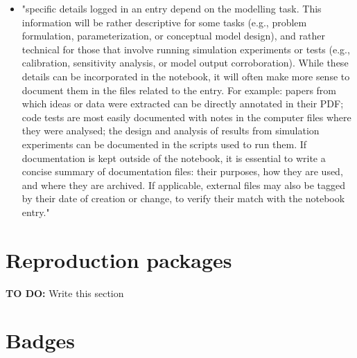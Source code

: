 \begin{itemize}
    \item "specific details logged in an entry depend on the modelling task. This information will be rather descriptive for some tasks (e.g., problem formulation, parameterization, or conceptual model design), and rather technical for those that involve running simulation experiments or tests (e.g., calibration, sensitivity analysis, or model output corroboration). While these details can be incorporated in the notebook, it will often make more sense to document them in the files related to the entry. For example: papers from which ideas or data were extracted can be directly annotated in their PDF; code tests are most easily documented with notes in the computer files where they were analysed; the design and analysis of results from simulation experiments can be documented in the scripts used to run them. If documentation is kept outside of the notebook, it is essential to write a concise summary of documentation files: their purposes, how they are used, and where they are archived. If applicable, external files may also be tagged by their date of creation or change, to verify their match with the notebook entry."
\end{itemize}

\section{Reproduction packages}


\textbf{TO DO:} Write this section

\section{Badges}


